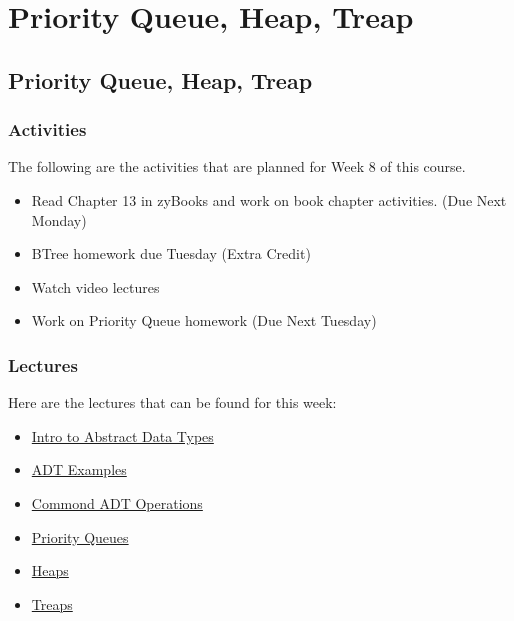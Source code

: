 \clearpage

\renewcommand{\ChapTitle}{Priority Queue, Heap, Treap}

\chapter{\ChapTitle}
\section{\ChapTitle}

\subsection{Activities}

The following are the activities that are planned for Week 8 of this course.

\begin{itemize}
    \item Read Chapter 13 in zyBooks and work on book chapter activities. (Due Next Monday)
    \item BTree homework due Tuesday (Extra Credit)
    \item Watch video lectures
    \item Work on Priority Queue homework (Due Next Tuesday)
\end{itemize}

\subsection{Lectures}

Here are the lectures that can be found for this week:

\begin{itemize}
    \item \href{https://applied.cs.colorado.edu/mod/hvp/view.php?id=45994}{Intro to Abstract Data Types}
    \item \href{https://applied.cs.colorado.edu/mod/hvp/view.php?id=45995}{ADT Examples}
    \item \href{https://applied.cs.colorado.edu/mod/hvp/view.php?id=45996}{Commond ADT Operations}
    \item \href{https://applied.cs.colorado.edu/mod/hvp/view.php?id=45997}{Priority Queues}
    \item \href{https://applied.cs.colorado.edu/mod/hvp/view.php?id=45998}{Heaps}
    \item \href{https://applied.cs.colorado.edu/mod/hvp/view.php?id=45999}{Treaps}
\end{itemize}

